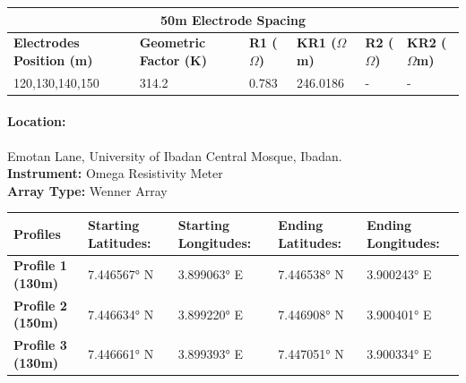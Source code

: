 \documentclass[12pt,a4paper]{report}
\begin{document}
\begin{table}[h!]
    \centering
    \begin{adjustbox}{max width=\textwidth}
    \setlength{\tabcolsep}{15pt}
    \renewcommand{\arraystretch}{1.5}
    \begin{tabular}{|p{3.0cm}|p{2.5cm}|p{1.8cm}|p{2.5cm}|p{2cm}|p{3.0cm}|}
    \hline
    \multicolumn{6}{|c|}{\rule{0pt}{2em}\huge\textbf{50m Electrode Spacing}} \\
    \hline
    \textbf{Electrodes Position (m)} & \textbf{Geometric Factor (K)} & \textbf{R1 ($\Omega$)} & \textbf{KR1 ($\Omega$m)} & \textbf{R2 ($\Omega$)} & \textbf{KR2 ($\Omega$m)}  \\ \hline
    120,130,140,150 & 314.2 & 0.783 & 246.0186 & - & - \\ \hline
    \end{tabular}
\end{adjustbox}
\end{table}

\paragraph{\textbf{Location:}} {Emotan Lane, University of Ibadan Central Mosque, Ibadan.} \\
\textbf{Instrument:} {Omega Resistivity Meter} \\
\textbf{Array Type:} {Wenner Array}

\begin{table}[h!]
    \begin{adjustbox}{max width=\textwidth}
    \renewcommand{\arraystretch}{1.5}
    \begin{tabular}{|p{3.3cm}|p{2.4cm}|p{2.4cm}|p{2.4cm}|p{2.4cm}|}
    \hline
    \textbf{Profiles} &  
    \textbf{Starting Latitudes:} & 
    \textbf{Starting Longitudes:} & 
    \textbf{Ending Latitudes:} &
    \textbf{Ending Longitudes:} \\
    \hline
    \textbf{Profile 1 (130m)} & 7.446567° N & 3.899063° E & 7.446538° N & 3.900243° E  \\ \hline
    \textbf{Profile 2 (150m)} & 7.446634° N & 3.899220° E & 7.446908° N & 3.900401° E  \\ \hline
    \textbf{Profile 3 (130m)} & 7.446661° N & 3.899393° E & 7.447051° N & 3.900334° E  \\ \hline
    \end{tabular}
    \end{adjustbox}
    \label{tab:UI Mosque CST Coordinates: 1-10}
\end{table}
\end{document}
